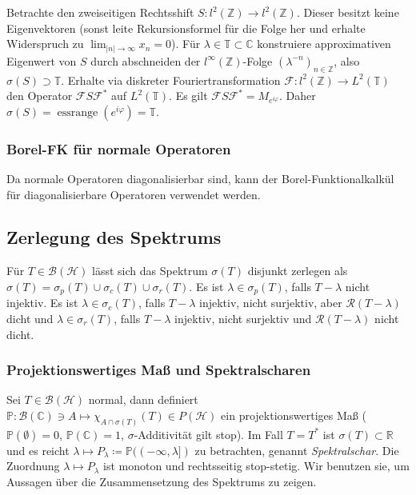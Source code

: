 \documentclass[11pt,a4paper]{scrartcl}
\newcommand{\Z}{\mathbb{Z}} %
\newcommand{\R}{\mathbb{R}} %
\newcommand{\C}{\mathbb{C}} %
\newcommand{\Hc}{\mathcal{H}}
\newcommand{\B}{\mathcal{B}}
\newcommand{\F}{\mathcal{F}}
\newcommand{\Rc}{\mathcal{R}}
\theoremstyle{plain}
\theoremstyle{definition}
\theoremstyle{remark}
\DeclareMathOperator{\essrange}{ess range}
\begin{document}
Betrachte den zweiseitigen Rechtsshift $S: l^2(\Z) \to l^2(\Z)$. Dieser besitzt keine Eigenvektoren (sonst leite Rekursionsformel für die Folge her und erhalte Widerspruch zu $\lim_{|n|\to \infty} x_n = 0$). Für $\lambda \in \mathbb{T} \subset \C$ konstruiere approximativen Eigenwert von $S$ durch abschneiden der $l^\infty(\Z)$-Folge $(\lambda^{-n})_{n\in \Z}$, also $\sigma(S) \supset \mathbb{T}$. Erhalte via diskreter Fouriertransformation $\F: l^2(\Z) \to L^2(\mathbb T)$ den Operator $\F S\F^*$ auf $L^2(\mathbb T)$. Es gilt $\F S\F^*=M_{e^{i\varphi}}$. Daher $\sigma(S)=\essrange(e^{i\varphi})=\mathbb{T}$.

\subsubsection{Borel-FK für normale Operatoren}

Da normale Operatoren diagonalisierbar sind, kann der Borel-Funktionalkalkül für diagonalisierbare Operatoren verwendet werden.

\subsection{Zerlegung des Spektrums}

Für $T\in \B(\Hc)$ lässt sich das Spektrum $\sigma(T)$ disjunkt zerlegen als $\sigma(T)=\sigma_p(T) \cup \sigma_c(T) \cup \sigma_r(T)$. Es ist $\lambda \in \sigma_p(T)$, falls $T-\lambda$ nicht injektiv. Es ist $\lambda \in \sigma_c(T)$, falls $T-\lambda$ injektiv, nicht surjektiv, aber $\Rc(T-\lambda)$ dicht und $\lambda \in \sigma_r(T)$, falls $T-\lambda$ injektiv, nicht surjektiv und $\Rc(T-\lambda)$ nicht dicht.

\subsubsection{Projektionswertiges Maß und Spektralscharen}

Sei $T\in \B(\Hc)$ normal, dann definiert $\mathbb{P}: \B(\C) \ni A \mapsto \chi_{A\cap \sigma(T)}(T) \in P(\Hc)$ ein projektionswertiges Maß ($\mathbb{P}(\emptyset) = 0$, $\mathbb{P}(\C) = 1$, $\sigma$-Additivität gilt stop). Im Fall $T=T^*$ ist $\sigma(T)\subset \R$ und es reicht $\lambda \mapsto P_\lambda \coloneqq \mathbb{P}((-\infty, \lambda])$ zu betrachten, genannt \emph{Spektralschar}. Die Zuordnung $\lambda \mapsto P_\lambda$ ist monoton und rechtsseitig stop-stetig. Wir benutzen sie, um Aussagen über die Zusammensetzung des Spektrums zu zeigen.
\end{document}
